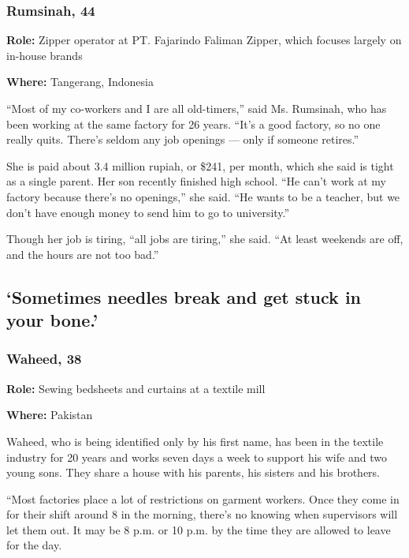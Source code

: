 \hypertarget{rumsinah-44}{%
\subsubsection{Rumsinah, 44}\label{rumsinah-44}}

\textbf{Role:} Zipper operator at PT. Fajarindo Faliman Zipper, which
focuses largely on in-house brands

\textbf{Where:} Tangerang, Indonesia

``Most of my co-workers and I are all old-timers,'' said Ms. Rumsinah,
who has been working at the same factory for 26 years. ``It's a good
factory, so no one really quits. There's seldom any job openings ---
only if someone retires.''

She is paid about 3.4 million rupiah, or \$241, per month, which she
said is tight as a single parent. Her son recently finished high school.
``He can't work at my factory because there's no openings,'' she said.
``He wants to be a teacher, but we don't have enough money to send him
to go to university.''

Though her job is tiring, ``all jobs are tiring,'' she said. ``At least
weekends are off, and the hours are not too bad.''

\hypertarget{sometimes-needles-break-and-get-stuck-in-your-bone}{%
\subsection{`Sometimes needles break and get stuck in your
bone.'}\label{sometimes-needles-break-and-get-stuck-in-your-bone}}

\hypertarget{waheed-38}{%
\subsubsection{Waheed, 38}\label{waheed-38}}

\textbf{Role:} Sewing bedsheets and curtains at a textile mill

\textbf{Where:} Pakistan

Waheed, who is being identified only by his first name, has been in the
textile industry for 20 years and works seven days a week to support his
wife and two young sons. They share a house with his parents, his
sisters and his brothers.

``Most factories place a lot of restrictions on garment workers. Once
they come in for their shift around 8 in the morning, there's no knowing
when supervisors will let them out. It may be 8 p.m. or 10 p.m. by the
time they are allowed to leave for the day.

